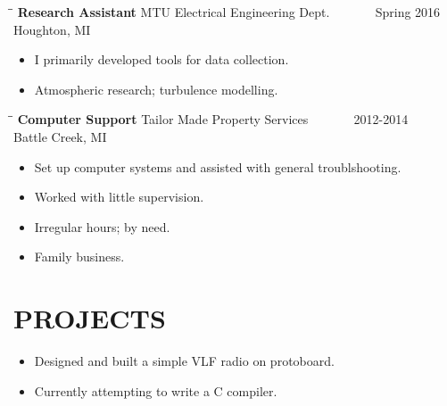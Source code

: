 \documentclass[letterpaper]{res}
\begin{document}
\begin{resume}
  \vspace{-0.15in}
  \begin{tabbing}
    \hspace{2.3in}\= \hspace{2.6in}\= \kill %
    {\bf Research Assistant} \>MTU Electrical Engineering Dept. \> ~~~~~~ Spring 2016\\
    \>Houghton, MI
  \end{tabbing}\vspace{-10pt}
  \begin{itemize} \itemsep1pt \parskip0pt 
    \item I primarily developed tools for data collection.
    \item Atmospheric research; turbulence modelling.
  \end{itemize}

  \vspace{-0.15in}
  \begin{tabbing}
    \hspace{2.3in}\= \hspace{2.6in}\= \kill %
    {\bf Computer Support} \>Tailor Made Property Services \> ~~~~~~ 2012-2014\\
    \>Battle Creek, MI
  \end{tabbing}\vspace{-10pt}
  \begin{itemize} \itemsep1pt \parskip0pt 
    \item Set up computer systems and assisted with general troublshooting.
    \item Worked with little supervision.
    \item Irregular hours; by need.
    \item Family business.
  \end{itemize}

  \section{PROJECTS}
  \begin{itemize}
    \item Designed and built a simple VLF radio on protoboard.
    \item Currently attempting to write a C compiler.
  \end{itemize}


\end{resume}
\end{document}

